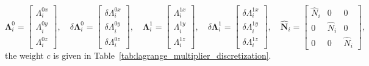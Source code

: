 \begin{equation}
	\boldsymbol{\Lambda}^0_i = \begin{bmatrix}
		\Lambda_i^{0x} \\
		\Lambda_i^{0y} \\
		\Lambda_i^{0z}
	\end{bmatrix},\quad
	\delta\boldsymbol{\Lambda}^0_i = \begin{bmatrix}
		\delta\Lambda_i^{0x} \\
		\delta\Lambda_i^{0y} \\
		\delta\Lambda_i^{0z}
	\end{bmatrix},\quad
	\boldsymbol{\Lambda}^1_i = \begin{bmatrix}
		\Lambda_i^{1x} \\
		\Lambda_i^{1y} \\
		\Lambda_i^{1z}
	\end{bmatrix},\quad
	\delta\boldsymbol{\Lambda}^1_i = \begin{bmatrix}
		\delta\Lambda_i^{1x} \\
		\delta\Lambda_i^{1y} \\
		\delta\Lambda_i^{1z}
	\end{bmatrix},\quad\hat{\mathbf{N}}_i = \begin{bmatrix}
		\hat{N}_i & 0         & 0         \\
		0         & \hat{N}_i & 0         \\
		0         & 0         & \hat{N}_i
	\end{bmatrix},
\end{equation}
the weight $c$ is given in Table~\ref{tab:lagrange_multiplier_discretization}.

